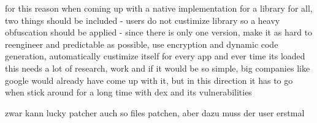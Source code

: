 for this reason when coming up with a native implementation for a library for all, two things should be included
- users do not custimize library so a heavy obfuscation should be applied
- since there is only one version, make it as hard to reengineer and predictable as possible, use encryption and dynamic code generation, automatically custimize itself for every app and ever time its loaded
this needs a lot of research, work and if it would be so simple, big companies like google would already have come up with it, but in this direction it has to go when stick around for a long time with dex and its vulnerabilities

zwar kann lucky patcher auch so files patchen, aber dazu muss der user erstmal 
